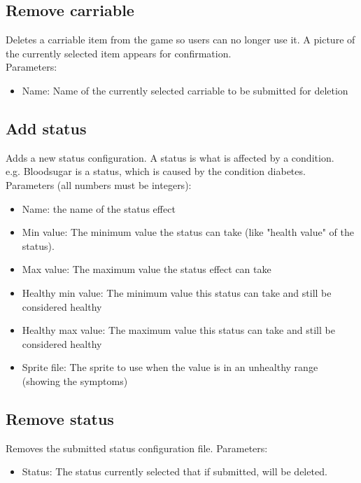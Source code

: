 \documentclass[a4paper,12pt]{article}
\begin{document}
\subsection*{Remove carriable}
Deletes a carriable item from the game so users can no longer use it. A picture of the currently
selected item appears for confirmation.\\
Parameters:
\begin{itemize}
	\setlength\itemsep{0em}
	\item Name: Name of the currently selected carriable to be submitted for deletion
\end{itemize}

\newpage

\subsection*{Add status}
Adds a new status configuration. A status is what is affected by a condition.\\
e.g. Bloodsugar is a status, which is caused by the condition diabetes.\\
Parameters (all numbers must be integers):
\begin{itemize}
	\setlength\itemsep{0em}
	\item Name: the name of the status effect
	\item Min value: The minimum value the status can take (like "health value" of the status).
	\item Max value: The maximum value the status effect can take
	\item Healthy min value: The minimum value this status can take and still be considered healthy
	\item Healthy max value: The maximum value this status can take and still be considered healthy
	\item Sprite file: The sprite to use when the value is in an unhealthy range (showing the symptoms)
\end{itemize}

\subsection*{Remove status}
Removes the submitted status configuration file.
Parameters:
\begin{itemize}
	\setlength\itemsep{0em}
	\item Status: The status currently selected that if submitted, will be deleted.
\end{itemize}
\end{document}
